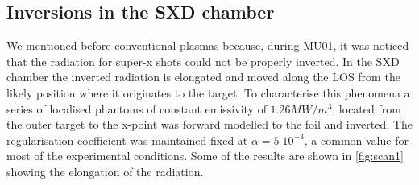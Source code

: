 \subsection{Inversions in the SXD chamber}\label{Inversions in the SXD}

We mentioned before conventional plasmas because, during MU01, it was noticed that the radiation for super-x shots could not be properly inverted. In the SXD chamber the inverted radiation is elongated and moved along the LOS from the likely position where it originates to the target. To characterise this phenomena a series of localised phantoms of constant emissivity of $1.26MW/m^3$, located from the outer target to the x-point was forward modelled to the foil and inverted. The regularisation coefficient was maintained fixed at $\alpha=5 \; 10^{-3}$, a common value for most of the experimental conditions. Some of the results are shown in \autoref{fig:scan1} showing the elongation of the radiation.

